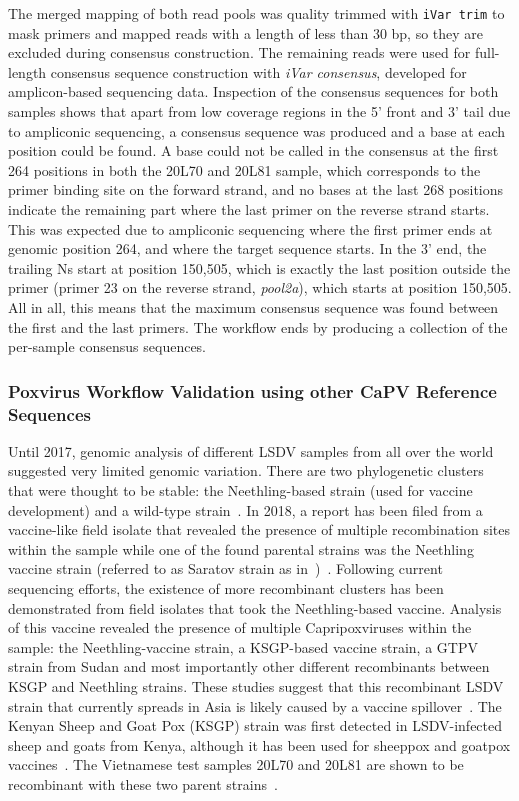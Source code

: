 The merged mapping of both read pools was quality trimmed with \texttt{iVar trim} to mask primers and mapped reads with a length of less than 30 bp, so they are excluded during consensus construction. The remaining reads were used for full-length consensus sequence construction with \textit{iVar consensus}, developed for amplicon-based sequencing data. Inspection of the consensus sequences for both samples shows that apart from low coverage regions in the 5' front and 3' tail due to ampliconic sequencing, a consensus sequence was produced and a base at each position could be found. A base could not be called in the consensus at the first 264 positions in both the 20L70 and 20L81 sample, which corresponds to the primer binding site on the forward strand, and no bases at the last 268 positions indicate the remaining part where the last primer on the reverse strand starts. This was expected due to ampliconic sequencing where the first primer ends at genomic position 264, and where the target sequence starts. In the 3' end, the trailing Ns start at position 150,505, which is exactly the last position outside the primer (primer 23 on the reverse strand, \textit{pool2a}), which starts at position 150,505. All in all, this means that the maximum consensus sequence was found between the first and the last primers. The workflow ends by producing a collection of the per-sample consensus sequences.

\subsubsection*{Poxvirus Workflow Validation using other CaPV Reference Sequences}
Until 2017, genomic analysis of different \ac{LSDV} samples from all over the world suggested very limited genomic variation. There are two phylogenetic clusters that were thought to be stable: the Neethling-based strain (used for vaccine development) and a wild-type strain~\cite{biswas2020extended}. In 2018, a report has been filed from a vaccine-like field isolate that revealed the presence of multiple recombination sites within the sample while one of the found parental strains was the Neethling vaccine strain (referred to as Saratov strain as in~)~\cite{sprygin2018analysis}. Following current sequencing efforts, the existence of more recombinant clusters has been demonstrated from field isolates that took the Neethling-based vaccine. Analysis of this vaccine revealed the presence of multiple Capripoxviruses within the sample: the Neethling-vaccine strain, a KSGP-based vaccine strain, a \ac{GTPV} strain from Sudan and most importantly other different recombinants between KSGP and Neethling strains. These studies suggest that this recombinant \ac{LSDV} strain that currently spreads in Asia is likely caused by a vaccine spillover~\cite{vandenbussche2022recombinant}. The Kenyan Sheep and Goat Pox (KSGP) strain was first detected in \ac{LSDV}-infected sheep and goats from Kenya, although it has been used for sheeppox and goatpox vaccines~\cite{tuppurainen2014characterization}. The Vietnamese test samples 20L70 and 20L81 are shown to be recombinant with these two parent strains~\cite{vandenbussche2022recombinant}.

